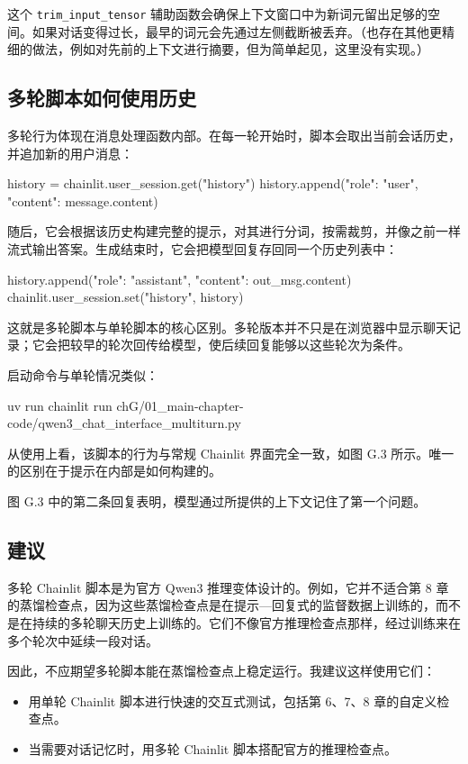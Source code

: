 这个 \texttt{trim\_input\_tensor} 辅助函数会确保上下文窗口中为新词元留出足够的空间。如果对话变得过长，最早的词元会先通过左侧截断被丢弃。（也存在其他更精细的做法，例如对先前的上下文进行摘要，但为简单起见，这里没有实现。）

\subsection{多轮脚本如何使用历史}

多轮行为体现在消息处理函数内部。在每一轮开始时，脚本会取出当前会话历史，并追加新的用户消息：

\begin{codebox}
history = chainlit.user_session.get("history")
history.append({"role": "user", "content": message.content})
\end{codebox}

随后，它会根据该历史构建完整的提示，对其进行分词，按需裁剪，并像之前一样流式输出答案。生成结束时，它会把模型回复存回同一个历史列表中：

\begin{codebox}
history.append({"role": "assistant", "content": out_msg.content})
chainlit.user_session.set("history", history)
\end{codebox}

这就是多轮脚本与单轮脚本的核心区别。多轮版本并不只是在浏览器中显示聊天记录；它会把较早的轮次回传给模型，使后续回复能够以这些轮次为条件。

启动命令与单轮情况类似：

\begin{codebox}
uv run chainlit run chG/01_main-chapter-code/qwen3_chat_interface_multiturn.py
\end{codebox}

从使用上看，该脚本的行为与常规 Chainlit 界面完全一致，如图 G.3 所示。唯一的区别在于提示在内部是如何构建的。


图 G.3 中的第二条回复表明，模型通过所提供的上下文记住了第一个问题。

\subsection{建议}

多轮 Chainlit 脚本是为官方 Qwen3 推理变体设计的。例如，它并不适合第 8 章的蒸馏检查点，因为这些蒸馏检查点是在提示—回复式的监督数据上训练的，而不是在持续的多轮聊天历史上训练的。它们不像官方推理检查点那样，经过训练来在多个轮次中延续一段对话。

因此，不应期望多轮脚本能在蒸馏检查点上稳定运行。我建议这样使用它们：

\begin{itemize}
\item 用单轮 Chainlit 脚本进行快速的交互式测试，包括第 6、7、8 章的自定义检查点。
\item 当需要对话记忆时，用多轮 Chainlit 脚本搭配官方的推理检查点。
\end{itemize}
